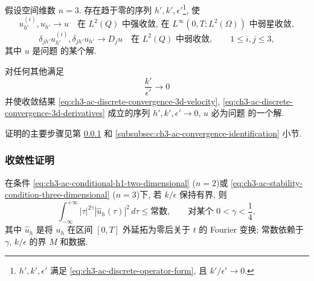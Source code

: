 \begin{Theorem}
\label{thm:ch3-ac-discrete-convergence-three-dimensional}
假设空间维数 $n=3$. 存在趋于零的序列 $h',k',\epsilon'$\footnote{$h',k',\epsilon'$ 满足 \eqref{eq:ch3-ac-discrete-operator-form}, 且 $k'/\epsilon'\to0$.}, 使
\begin{equation}
u_{h'}^{(i)},u_{h'}\longrightarrow u
\quad\text{在 }L^2(Q)\text{ 中强收敛, 在 }
L^\infty(0,T;L^2(\Omega))\text{ 中弱星收敛},
\label{eq:ch3-ac-discrete-convergence-3d-velocity}
\end{equation}
\begin{equation}
\delta_{jh'}u_{h'}^{(i)},\delta_{jh'}u_{h'}
\longrightarrow D_j u
\quad\text{在 }L^2(Q)\text{ 中弱收敛},
\qquad1\leq i,j\leq3,
\label{eq:ch3-ac-discrete-convergence-3d-derivatives}
\end{equation}
其中 $u$ 是问题  的某个解.

对任何其他满足
\begin{equation}
\frac{k'}{\epsilon'}\longrightarrow0
\label{eq:ch3-ac-discrete-other-sequence-ratio}
\end{equation}
并使收敛结果 \eqref{eq:ch3-ac-discrete-convergence-3d-velocity}, \eqref{eq:ch3-ac-discrete-convergence-3d-derivatives} 成立的序列 $h',k',\epsilon'\to0$, $u$ 必为问题  的一个解.
\end{Theorem}

证明的主要步骤见第 \ref{subsubsec:ch3-ac-convergence-proof} 和 \ref{subsubsec:ch3-ac-convergence-identification} 小节.

\subsubsection{收敛性证明}
\label{subsubsec:ch3-ac-convergence-proof}

\begin{Lemma}
\label{lem:ch3-ac-discrete-fourier-bound}
在条件 \eqref{eq:ch3-ac-conditional-h1-two-dimensional} ($n=2$)或 \eqref{eq:ch3-ac-stability-condition-three-dimensional} ($n=3$)下, 若 $k/\epsilon$ 保持有界, 则
\begin{equation}
\int_{-\infty}^{+\infty}|\tau|^{2\gamma}
|\widehat u_h(\tau)|^2\,d\tau
\leq\text{常数},
\qquad\text{对某个 }0<\gamma<\frac14,
\label{eq:ch3-ac-discrete-fourier-bound}
\end{equation}
其中 $\widehat u_h$ 是将 $u_h$ 在区间 $[0,T]$ 外延拓为零后关于 $t$ 的 Fourier 变换; 常数依赖于 $\gamma$, $k/\epsilon$ 的界 $M$ 和数据.
\end{Lemma}

